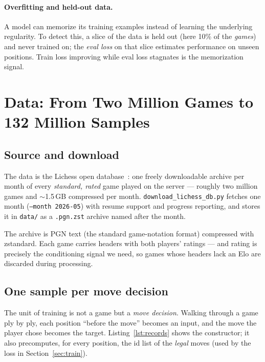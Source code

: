 \documentclass[10pt,a4paper]{article}
\newcommand{\code}[1]{\texttt{#1}}
\begin{document}
\paragraph{Overfitting and held-out data.} A model can memorize its
training examples instead of learning the underlying regularity. To
detect this, a slice of the data is held out (here 10\% of the
\emph{games}) and never trained on; the \emph{eval loss} on that slice
estimates performance on unseen positions. Train loss improving while
eval loss stagnates is the memorization signal.

\section{Data: From Two Million Games to 132 Million Samples}\label{sec:data}

\subsection{Source and download}

The data is the Lichess open database~\cite{lichess}: one freely
downloadable archive per month of every \emph{standard, rated} game played
on the server --- roughly two million games and $\sim$1.5\,GB compressed
per month. \verb|download_lichess_db.py| fetches one month
(\code{--month 2026-05}) with resume support and progress reporting, and
stores it in \code{data/} as a \code{.pgn.zst} archive named after the
month.

The archive is PGN text (the standard game-notation format) compressed
with zstandard. Each game carries headers with both players' ratings ---
and rating is precisely the conditioning signal we need, so games whose
headers lack an Elo are discarded during processing.

\subsection{One sample per move decision}

The unit of training is not a game but a \emph{move decision}. Walking
through a game ply by ply, each position ``before the move'' becomes an
input, and the move the player chose becomes the target. Listing~\ref{lst:records}
shows the constructor; it also precomputes, for every position, the id
list of the \emph{legal} moves (used by the loss in
Section~\ref{sec:train}).
\end{document}
